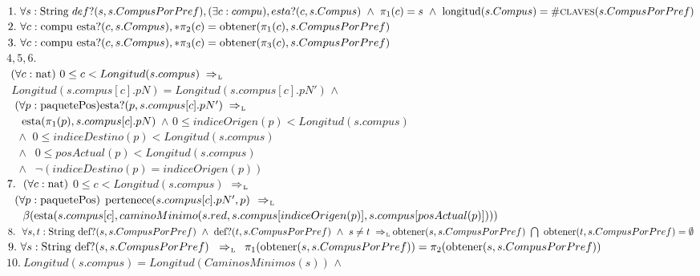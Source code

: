   \\
 $1.\ \paratodo{String}{s}\ \fun{$def?$}(s, s.CompusPorPref), (\exists c : compu), \fun{$esta?$}(c,s.Compus)\ \land\ \pi_1(c) = s\ \land\ \fun{longitud}(s.Compus) = \#\Fun{claves}(s.CompusPorPref)$\\
 $2.\ \paratodo{compu}{c}\ \fun{esta?}(c, s.Compus), *\pi_2(c) = \fun{obtener}(\pi_1(c),s.CompusPorPref) $\\
 $3.\ \paratodo{compu}{c}\ \fun{esta?}(c, s.Compus), *\pi_3(c) = \fun{obtener}(\pi_3(c),s.CompusPorPref) $\\
 $4,5,6.$ \\$\ (\paratodo{nat}{c})\ 0 \le c < Longitud(s.compus) \impluego$\\
  \indent $\ \ Longitud(s.compus[c].pN) = Longitud(s.compus[c].pN')$ $\land$ \\
  \indent $\ \ (\paratodo{paquetePos}{p}) \fun{esta?}(p,s.compus[c].pN') \impluego$\\
  \indent \indent \indent $\ \ \ \ \fun{esta}(\pi_1(p), s.compus[c].pN)$ $\land$ $0 \le indiceOrigen(p) < Longitud(s.compus)$\\
  \indent \indent \indent $\ \ \ \ \land$ $0 \le indiceDestino(p) < Longitud(s.compus)$\\
  \indent \indent \indent $\ \ \ \ \land$ $\ 0 \le posActual(p) < Longitud(s.compus)$\\
  \indent \indent \indent $\ \ \ \ \land$ $\ \neg(indiceDestino(p)=indiceOrigen(p))$\\
 $7.\ \ (\paratodo{nat}{c})$ $0 \le c < Longitud(s.compus)$ $\impluego$\\
 \indent \indent $\ \ (\paratodo{paquetePos}{p})$ $\fun{pertenece}(s.compus[c].pN', p)$ $\impluego$\\
 \indent \indent \indent $\ \ \ \ \beta(\fun{esta}(s.compus[c],caminoMinimo(s.red,s.compus[indiceOrigen(p)],s.compus[posActual(p)])))$\\
 $8.\ \ \paratodo{String}{s,t}\ \fun{def?}(s, s.CompusPorPref)\ \land\ \fun{def?}(t, s.CompusPorPref)\ \land\ s \neq t \impluego \\ \fun{obtener}(s, s.CompusPorPref)\ \bigcap\ \fun{obtener}(t, s.CompusPorPref) = \emptyset$\\
 $9.\ \paratodo{String}{s}\ \fun{def?}(s, s.CompusPorPref)\ \impluego\ \pi_1(\fun{obtener}(s, s.CompusPorPref)) =\\ \pi_2(\fun{obtener}(s, s.CompusPorPref))$ \\
 $10.\ Longitud(s.compus) = Longitud(CaminosMinimos(s))$ $\land$\\
